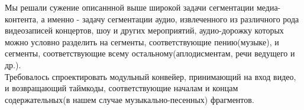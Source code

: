 \documentclass[../body.tex]{subfiles}
\begin{document}
	Мы решали сужение описаннной выше широкой задачи сегментации медиа-контента, а именно - задачу сегментации аудио, извлеченного из различного рода видеозаписей концертов, шоу и других мероприятий, аудио-дорожку которых можно условно разделить на сегменты, соответствующие пению(музыке), и сегменты, соответствующие всему остальному(аплодисментам, речи ведущего и др.).\\
	Требовалось спроектировать модульный конвейер, принимающий на вход видео, и возвращающий таймкоды, соответствующие началам и концам содержательных(в нашем случае музыкально-песенных) фрагментов.
\end{document}
